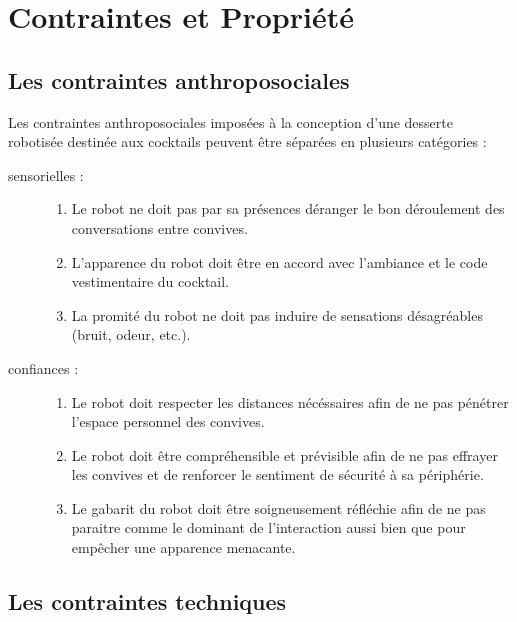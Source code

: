 \chapter{Contraintes et Propriété}

\section{Les contraintes anthroposociales}

Les contraintes anthroposociales imposées à la conception d'une
desserte robotisée destinée aux cocktails peuvent être séparées en
plusieurs catégories :
\begin{description}
\item[sensorielles :]
  \begin{enumerate}
  \item Le robot ne doit pas par sa présences déranger le bon déroulement des conversations entre convives.
  \item L'apparence du robot doit être en accord avec l'ambiance et le code vestimentaire du cocktail.
  \item La promité du robot ne doit pas induire de sensations désagréables (bruit, odeur, etc.).
  \end{enumerate}
\item[confiances :]
  \begin{enumerate}
  \item Le robot doit respecter les distances nécéssaires afin de ne pas pénétrer l'espace personnel des convives.
  \item Le robot doit être compréhensible et prévisible afin de ne pas effrayer les convives et de renforcer le sentiment de sécurité à sa périphérie.
  \item Le gabarit du robot doit être soigneusement réfléchie afin de ne pas paraitre comme le dominant de l'interaction aussi bien que pour empêcher une apparence menacante.
  \end{enumerate}
\end{description}




\section{Les contraintes techniques}

